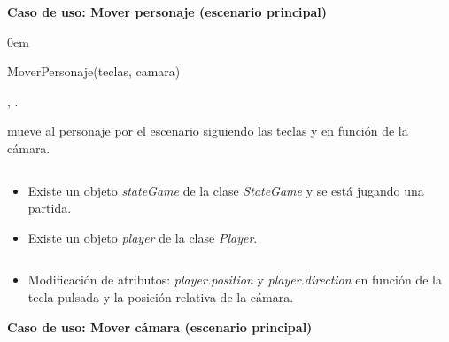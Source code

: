 \textbf{Caso de uso: Mover personaje (escenario principal)}


\begin{description}
    \itemsep0em
    \item [Operación] MoverPersonaje(teclas, camara)
    \item [Actores] \jugador, \sistema.
    \item [Responsabilidades] mueve al personaje por el escenario siguiendo
    las teclas y en función de la cámara.
    \item [Precondiciones] $\quad$
        \begin{itemize}
            \itemsep0em
            \item Existe un objeto \textit{stateGame} de la clase \textit{StateGame}
            y se está jugando una partida.
            \item Existe un objeto \textit{player} de la clase \textit{Player}.
        \end{itemize}
    \item [Postcondiciones] $\quad$
        \begin{itemize}
            \itemsep0em
            \item Modificación de atributos: \textit{player.position} y
            \textit{player.direction} en función de la tecla pulsada y la
            posición relativa de la cámara.\\
        \end{itemize}
\end{description}



\textbf{Caso de uso: Mover cámara (escenario principal)}


